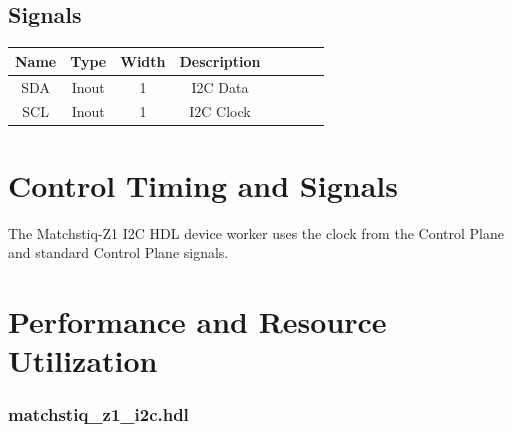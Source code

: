 \documentclass{article}
\def\comp{matchstiq\_z1\_i2c}
\edef\ecomp{matchstiq_z1_i2c}
\begin{document}
\begin{landscape}
	\section*{Signals}
	\begin{scriptsize}
	\begin{tabular}{|c|c|c|c|p{2.6cm}|c|c|c|}
		\hline
		\rowcolor{blue}
		Name & Type  & Width & Description \\
		\hline
		SDA  & Inout & 1     & I2C Data    \\
		\hline
		SCL  & Inout & 1     & I2C Clock   \\
		\hline
	\end{tabular}
	\end{scriptsize}
\end{landscape}

\section*{Control Timing and Signals}
The Matchstiq-Z1 I2C HDL device worker uses the clock from the Control Plane and standard Control Plane signals.

\section*{Performance and Resource Utilization}
\subsubsection*{\comp.hdl}

\end{document}
